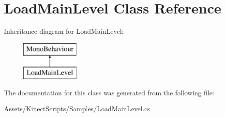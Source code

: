 \hypertarget{class_load_main_level}{}\section{Load\+Main\+Level Class Reference}
\label{class_load_main_level}
Inheritance diagram for Load\+Main\+Level\+:\begin{figure}[H]
\begin{center}
\leavevmode
\includegraphics[height=2.000000cm]{class_load_main_level}
\end{center}
\end{figure}


The documentation for this class was generated from the following file\+:\begin{DoxyCompactItemize}
\item 
Assets/\+Kinect\+Scripts/\+Samples/Load\+Main\+Level.\+cs\end{DoxyCompactItemize}
